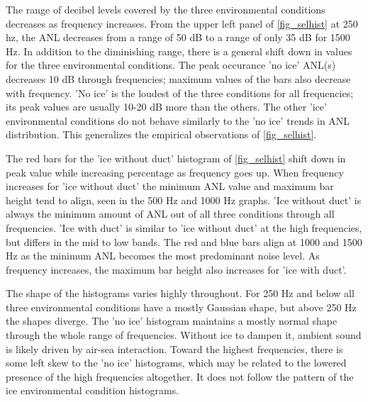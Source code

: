 The range of decibel levels covered by the three environmental conditions decreases as frequency increases. From the upper left panel of \autoref{fig_selhist} at 250 hz, the ANL decreases from a range of 50 dB to a range of only 35 dB for 1500 Hz. In addition to the diminishing range, there is a general shift down in values for the three environmental conditions. The peak occurance 'no ice' ANL(s) decreases 10 dB through frequencies; maximum values of the bars also decrease with frequency. 'No ice' is the loudest of the three conditions for all frequencies; its peak values are usually 10-20 dB more than the others. The other 'ice' environmental conditions do not behave similarly to the 'no ice' trends in ANL distribution. This generalizes the empirical observations of \autoref{fig_selhist}. 


The red bars for the 'ice without duct' histogram of \autoref{fig_selhist} shift down in peak value while increasing percentage as frequency goes up. When frequency increases for 'ice without duct' the minimum ANL value and maximum bar height tend to align, seen in the 500 Hz and 1000 Hz graphs. 'Ice without duct' is always the minimum amount of ANL out of all three conditions through all frequencies. 'Ice with duct' is similar to 'ice without duct' at the high frequencies, but differs in the mid to low bands. The red and blue bars align at 1000 and 1500 Hz as the minimum ANL becomes the most predominant noise level. As frequency increases, the maximum bar height also increases for 'ice with duct'.

The shape of the histograms varies highly throughout. For 250 Hz and below all three environmental conditions have a mostly Gaussian shape, but above 250 Hz the shapes diverge. The 'no ice' histogram maintains a mostly normal shape through the whole range of frequencies. Without ice to dampen it, ambient sound is likely driven by air-sea interaction. Toward the highest frequencies, there is some left skew to the 'no ice' histograms, which may be related to the lowered presence of the high frequencies altogether. It does not follow the pattern of the ice environmental condition histograms.

